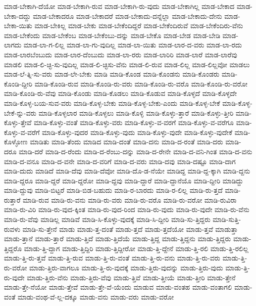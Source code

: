 {ಮಾಡ-ಬೇಕಾಗಿ-ದೆಯೋ
ಮಾಡ-ಬೇಕಾಗಿ-ರುವ
ಮಾಡ-ಬೇಕಾಗಿ-ರು-ವುದು
ಮಾಡ-ಬೇಕಾಗಿಲ್ಲ
ಮಾಡ-ಬೇಕಾದ
ಮಾಡ-ಬೇಕಾ-ದದ್ದು
ಮಾಡ-ಬೇಕಾದರೂ
ಮಾಡ-ಬೇಕಾದರೆ
ಮಾಡ-ಬೇಕಾದು-ದನ್ನೆಲ್ಲಾ
ಮಾಡ-ಬೇಕಾದು-ದೇನು
ಮಾಡ-ಬೇಕಾ-ಯಿತು
ಮಾಡ-ಬೇಕಿಲ್ಲ
ಮಾಡ-ಬೇಕು
ಮಾಡ-ಬೇಕೆಂದಿದ್ದರೆ
ಮಾಡ-ಬೇಕೆಂದಿರುವೆ
ಮಾಡ-ಬೇಕೆಂದಿರು-ವೆನು
ಮಾಡ-ಬೇಕೆಂದು
ಮಾಡ-ಬೇಕೆಂಬ
ಮಾಡ-ಬೇಕೆಂಬು-ದನ್ನು
ಮಾಡ-ಬೇಕೊ
ಮಾಡ-ಬೇಡ
ಮಾಡ-ಬೇಡಿ
ಮಾಡ-ಲಾಗದು
ಮಾಡ-ಲಾ-ಗ-ಲಿಲ್ಲ
ಮಾಡ-ಲಾ-ಗು-ವುದಿಲ್ಲ
ಮಾಡ-ಲಾ-ಯಿತು
ಮಾಡ-ಲಾರ-ದ-ವರು
ಮಾಡ-ಲಾ-ರದು
ಮಾಡ-ಲಾರಬೆಂಬುದು
ಮಾಡ-ಲಾರ-ದೆಂಬುದು
ಮಾಡ-ಲಾ-ರರು
ಮಾಡ-ಲಾರಿರಿ
ಮಾಡ-ಲಾರೆ
ಮಾಡ-ಲಾರೆವು
ಮಾಡಲಿ
ಮಾಡ-ಲಿ-ಚ್ಛಿ-ಸು-ವುದಿಲ್ಲ
ಮಾಡ-ಲಿ-ಚ್ಛಿಸು-ವೆನು
ಮಾಡ-ಲಿ-ರುವ
ಮಾಡ-ಲಿಲ್ಲ
ಮಾಡ-ಲಿಲ್ಲವೋ
ಮಾಡಲು
ಮಾಡ-ಲೆ-ತ್ನಿ-ಸು-ವರು
ಮಾಡ-ಲೇ-ಬೇಕು
ಮಾಡಿ
ಮಾಡಿ-ಕೊಂಡ
ಮಾಡಿ-ಕೊಂಡನು
ಮಾಡಿ-ಕೊಂಡರು
ಮಾಡಿ-ಕೊಂಡಿ-ದ್ದೀರಿ
ಮಾಡಿ-ಕೊಂಡಿ-ರುವ
ಮಾಡಿ-ಕೊಂಡಿ-ರು-ವರು
ಮಾಡಿ-ಕೊಂಡಿ-ರು-ವರೊ
ಮಾಡಿ-ಕೊಂಡಿ-ರು-ವರೋ
ಮಾಡಿ-ಕೊಂಡಿ-ರು-ವೆವು
ಮಾಡಿ-ಕೊಂಡು
ಮಾಡಿ-ಕೊಡಲು
ಮಾಡಿ-ಕೊಡುವ
ಮಾಡಿ-ಕೊಳ್ಳದೆ
ಮಾಡಿ-ಕೊಳ್ಳದೇ
ಮಾಡಿ-ಕೊಳ್ಳ-ಬಯ-ಸುವ-ವರು
ಮಾಡಿ-ಕೊಳ್ಳ-ಬೇಕು
ಮಾಡಿ-ಕೊಳ್ಳ-ಬೇಕು-ಎಂದು
ಮಾಡಿ-ಕೊಳ್ಳ-ಬೇಕೆ
ಮಾಡಿ-ಕೊಳ್ಳ-ಬೇಕೆ-ನ್ನು-ವರು
ಮಾಡಿ-ಕೊಳ್ಳಲಾರ
ಮಾಡಿ-ಕೊಳ್ಳಲು
ಮಾಡಿ-ಕೊಳ್ಳಿ
ಮಾಡಿ-ಕೊಳ್ಳು-ತ್ತಾರೆ
ಮಾಡಿ-ಕೊಳ್ಳು-ತ್ತೀರಿ
ಮಾಡಿ-ಕೊಳ್ಳು-ತ್ತೇವೆ
ಮಾಡಿ-ಕೊಳ್ಳು-ವಂತೆ
ಮಾಡಿ-ಕೊಳ್ಳು-ವರು
ಮಾಡಿ-ಕೊಳ್ಳು-ವ-ವರಗೆ
ಮಾಡಿ-ಕೊಳ್ಳು-ವ-ವರೆಗೂ
ಮಾಡಿ-ಕೊಳ್ಳು-ವ-ವರೆಗೆ
ಮಾಡಿ-ಕೊಳ್ಳು-ವುದರ
ಮಾಡಿ-ಕೊಳ್ಳು-ವುದು
ಮಾಡಿ-ಕೊಳ್ಳು-ವುದೇ
ಮಾಡಿ-ಕೊಳ್ಳು-ವುದೇಕೆ
ಮಾಡಿ-ಕೊಳ್ಳೋಣ
ಮಾಡಿತು
ಮಾಡಿ-ತೆಂದು
ಮಾಡಿದ
ಮಾಡಿ-ದಂತೆ
ಮಾಡಿ-ದನು
ಮಾಡಿ-ದ-ರಂತೆ
ಮಾಡಿ-ದರು
ಮಾಡಿ-ದರೂ
ಮಾಡಿ-ದರೆ
ಮಾಡಿ-ದ-ರೆಂದು
ಮಾಡಿ-ದ-ರೆಂಬು-ದನ್ನು
ಮಾಡಿ-ದ-ರೇನೇ
ಮಾಡಿ-ದ-ವನಿ-ಗಿಂತ
ಮಾಡಿ-ದ-ವನು
ಮಾಡಿ-ದ-ವನೂ
ಮಾಡಿ-ದ-ವನೇ
ಮಾಡಿ-ದ-ವರಿಗೆ
ಮಾಡಿ-ದ-ವರು
ಮಾಡಿ-ದವು
ಮಾಡಿ-ದಷ್ಟೂ
ಮಾಡಿ-ದಾಗ
ಮಾಡಿ-ದುದು
ಮಾಡಿದೆ
ಮಾಡಿ-ದೆವು
ಮಾಡಿ-ದೆವೋ
ಮಾಡಿ-ದೊ-ಡ-ನೆಯೇ
ಮಾಡಿದ್ದ
ಮಾಡಿ-ದ್ದ-ಕ್ಕಾಗಿ
ಮಾಡಿ-ದ್ದನು
ಮಾಡಿ-ದ್ದರೂ
ಮಾಡಿ-ದ್ದರೆ
ಮಾಡಿ-ದ್ದರೋ
ಮಾಡಿ-ದ್ದವು
ಮಾಡಿ-ದ್ದಾರೆ
ಮಾಡಿ-ದ್ದಾನೆಯೊ
ಮಾಡಿ-ದ್ದೀರಿ
ಮಾಡಿದ್ದು
ಮಾಡಿ-ದ್ದುವು
ಮಾಡಿ-ಬಿಟ್ಟರೆ
ಮಾಡಿ-ಬಿಡ-ಬಹುದು
ಮಾಡಿ-ರ-ಬಾರದು
ಮಾಡಿ-ರ-ಲಿಲ್ಲ
ಮಾಡಿ-ರು-ತ್ತದೆ
ಮಾಡಿ-ರುತ್ತಾರೆ
ಮಾಡಿ-ರುವ
ಮಾಡಿ-ರು-ವನು
ಮಾಡಿ-ರು-ವರು
ಮಾಡಿ-ರು-ವರೊ
ಮಾಡಿ-ರು-ವರೋ
ಮಾಡಿ-ರುವಿರಾ
ಮಾಡಿ-ರು-ವಿರಿ
ಮಾಡಿ-ರು-ವುದ-ಕ್ಕಿಂತ
ಮಾಡಿ-ರು-ವುದ-ರಿಂದ
ಮಾಡಿ-ರು-ವುದು
ಮಾಡಿ-ರು-ವುದೇ
ಮಾಡಿ-ರು-ವೆನು
ಮಾಡಿ-ರು-ವೆವು
ಮಾಡಿಲ್ಲ
ಮಾಡಿವೆ
ಮಾಡಿ-ಸಿ-ಕೊಳ್ಳು-ವುದಕ್ಕೆ
ಮಾಡಿ-ಸಿ-ದ್ದೀರಿ
ಮಾಡಿ-ಸು-ತ್ತಿದ್ದರು
ಮಾಡಿ-ಸುತ್ತಿ-ರುವಳು
ಮಾಡಿ-ಸು-ತ್ತೇನೆ
ಮಾಡು
ಮಾಡು-ತ್ತ-ದಂತೆ
ಮಾಡು-ತ್ತದೆ
ಮಾಡು-ತ್ತದೆಯೋ
ಮಾಡು-ತ್ತವೆ
ಮಾಡುತ್ತಾ
ಮಾಡು-ತ್ತಾನೆ
ಮಾಡು-ತ್ತಾರೆ
ಮಾಡು-ತ್ತಿದೆ
ಮಾಡು-ತ್ತಿದೆಯೆ
ಮಾಡು-ತ್ತಿದ್ದ
ಮಾಡು-ತ್ತಿದ್ದನು
ಮಾಡು-ತ್ತಿದ್ದರು
ಮಾಡು-ತ್ತಿದ್ದರೊ
ಮಾಡು-ತ್ತಿ-ದ್ದಾಗ
ಮಾಡು-ತ್ತಿದ್ದಿರಿ
ಮಾಡು-ತ್ತಿದ್ದೀರೋ
ಮಾಡು-ತ್ತಿ-ದ್ದೇನೆ
ಮಾಡು-ತ್ತಿ-ರಲಿ
ಮಾಡು-ತ್ತಿ-ರಲಿಲ್ಲ
ಮಾಡು-ತ್ತಿ-ರು-ತ್ತವೆ
ಮಾಡು-ತ್ತಿ-ರುವ
ಮಾಡು-ತ್ತಿ-ರು-ವಂತೆ
ಮಾಡು-ತ್ತಿ-ರು-ವನು
ಮಾಡು-ತ್ತಿ-ರು-ವರು
ಮಾಡು-ತ್ತಿ-ರು-ವರೋ
ಮಾಡು-ತ್ತಿರು-ವಾಗಲೂ
ಮಾಡು-ತ್ತಿ-ರು-ವುದಕ್ಕೆ
ಮಾಡು-ತ್ತಿರು-ವುದನ್ನು
ಮಾಡು-ತ್ತಿರು-ವುದು
ಮಾಡು-ತ್ತಿ-ರು-ವುದೇ
ಮಾಡು-ತ್ತಿರು-ವೆನು
ಮಾಡು-ತ್ತಿರು-ವೆವು
ಮಾಡು-ತ್ತಿವೆ
ಮಾಡು-ತ್ತೀಯೆ
ಮಾಡು-ತ್ತೀರಿ
ಮಾಡು-ತ್ತೇನೆ
ಮಾಡು-ತ್ತೇ-ನೆಯೋ
ಮಾಡು-ತ್ತೇವೆ
ಮಾಡು-ತ್ತೇ-ವೆ-ಯೆಂದು
ಮಾಡುವ
ಮಾಡು-ವಂತಹ
ಮಾಡು-ವಂತಾಗಲಿ
ಮಾಡು-ವಂತೆ
ಮಾಡು-ವಂಥ-ವೆ-ಲ್ಲ-ದಕ್ಕೂ
ಮಾಡು-ವನು
ಮಾಡು-ವರು
ಮಾಡು-ವರೋ
}
